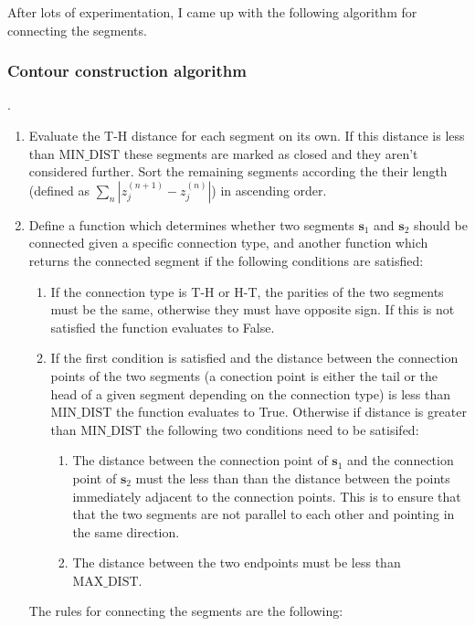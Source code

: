 \documentclass[12pt,dvipsnames]{report}
\newcommand{\ssf}[1]{\textsf{#1}}
\begin{document}
After lots of experimentation,
I came up with the following algorithm for connecting the segments.
\subsubsection{Contour construction algorithm}.
\begin{enumerate}
    \item Evaluate the T-H distance for each segment on its own. If this distance is less than
    $\text{MIN\_DIST}$ these segments are marked as closed and they aren't considered further.
    Sort the remaining segments according the their length (defined as 
    $\sum_n \left|z^{(n+1)}_j - z^{(n)}_j \right|$) in ascending order. 
    \item Define a function which determines whether two segments $\mathbf{s}_1$ and 
    $\mathbf{s}_2$ should be connected given a specific connection type, and another function 
    which returns the connected segment if the following conditions are satisfied:
    \begin{enumerate}
        \item If the connection type is T-H or H-T, the parities of the two segments must be 
        the same, otherwise they must have opposite sign. If this is not satisfied the 
        function evaluates to \ssf{False}.
        \item If the first condition is satisfied and the distance between the connection points
        of the two segments (a conection point is either the tail or the head of a given segment
        depending on the connection type) is less than $\text{MIN\_DIST}$ the function evaluates 
        to \ssf{True}. Otherwise if distance is greater than $\text{MIN\_DIST}$ the following
        two conditions need to be satisifed:
        \begin{enumerate}
        \item The distance between the connection point of $\mathbf{s}_1$ and the connection 
        point of $\mathbf{s}_2$  must the less than than the distance between the points 
        immediately adjacent to the connection points. This is to ensure that that the two 
        segments are not parallel to each other and pointing in the same direction.
        \item The distance between the two endpoints must be less than $\text{MAX\_DIST}$.
        \end{enumerate}
            \end{enumerate}
    The rules for connecting the segments are the following:

\end{enumerate}
\end{document}
